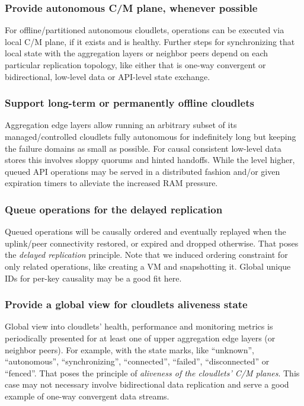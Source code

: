 \documentclass[conference]{IEEEtran}
\begin{document}
\subsubsection{Provide autonomous C/M plane, whenever possible}
For offline/partitioned autonomous cloudlets, operations can be executed via
local C/M plane, if it exists and is healthy. Further steps for synchronizing
that local state with the aggregation layers or neighbor peers depend on each
particular replication topology, like either that is one-way convergent or
bidirectional, low-level data or API-level state exchange.

\subsubsection{Support long-term or permanently offline cloudlets}
Aggregation edge layers allow running an arbitrary subset of its
managed/controlled cloudlets fully autonomous for indefinitely long but keeping
the failure domains as small as possible. For causal consistent low-level data
stores this involves sloppy quorums and hinted handoffs\cite{b17}. While the
level higher, queued API operations may be served in a distributed fashion
and/or given expiration timers to alleviate the increased RAM pressure.

\subsubsection{Queue operations for the delayed replication}
Queued operations will be causally ordered and eventually replayed when the
uplink/peer connectivity restored, or expired and dropped otherwise. That poses
the \textit{delayed replication} principle. Note that we induced ordering
constraint for only related operations, like creating a VM and snapshotting it.
Global unique IDs for per-key causality may be a good fit here.

\subsubsection{Provide a global view for cloudlets aliveness state}
Global view into cloudlets' health, performance and monitoring metrics is
periodically presented for at least one of upper aggregation edge layers (or
neighbor peers). For example, with the state marks, like ``unknown'',
``autonomous'', ``synchronizing'', ``connected'', ``failed'', ``disconnected''
or ``fenced''. That poses the principle of \textit{aliveness of the cloudlets'
C/M planes}. This case may not necessary involve bidirectional data
replication and serve a good example of one-way convergent data streams.
\end{document}
